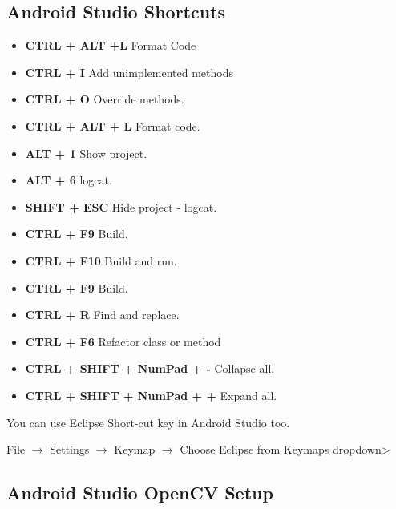 \documentclass[10pt,a4paper]{article}
\begin{document}
\subsection{Android Studio Shortcuts}
\begin{itemize}
	\item \textbf{CTRL + ALT +L} Format Code
	\item \textbf{CTRL + I} Add unimplemented methods
	\item \textbf{CTRL + O} Override methods.
	\item \textbf{CTRL + ALT + L} Format code.
	\item \textbf{ALT + 1} Show project.
	\item \textbf{ALT + 6}  logcat.
	\item \textbf{SHIFT + ESC} Hide project - logcat.
	\item \textbf{CTRL + F9} Build.
	\item \textbf{CTRL + F10} Build and run.
	\item \textbf{CTRL + F9} Build.
	\item \textbf{CTRL + R} Find and replace.
	\item \textbf{CTRL + F6} Refactor class or method
	\item \textbf{CTRL + SHIFT + NumPad + -} Collapse all.
	\item \textbf{CTRL + SHIFT + NumPad + +} Expand all.
\end{itemize}
	

You can use Eclipse Short-cut key in Android Studio too.

File $\rightarrow$ Settings $\rightarrow$ Keymap $\rightarrow$ Choose Eclipse from Keymaps dropdown>

\subsection{Android Studio OpenCV Setup}
\end{document}

